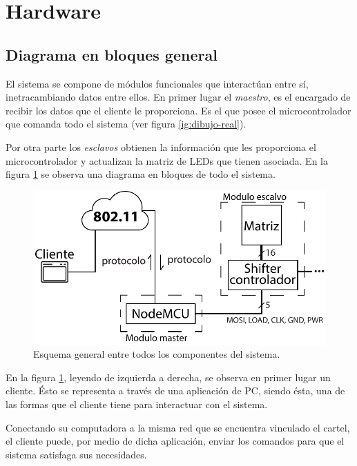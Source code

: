 \section{Hardware}\label{sec:hw}
\subsection{Diagrama en bloques general}
El sistema se compone de módulos funcionales que interactúan entre sí, inetracambiando datos entre ellos. En primer lugar el \emph{maestro}, es el encargado de recibir los datos que el cliente le proporciona. Es el que posee el microcontrolador que comanda todo el sistema (ver figura \ref{ig:dibujo-real}).

Por otra parte los \emph{esclavos} obtienen la información que les proporciona el microcontrolador y actualizan la matriz de LEDs que tienen asociada. En la figura \ref{fig:diagrama-bloques-general} se observa una diagrama en bloques de todo el sistema.

\begin{figure}[!ht]
	\centering
	\includegraphics[width=\linewidth]{imagenes/hw/diagrama-bloques-general.pdf}
	\caption{Esquema general entre todos los componentes del sistema.}
	\label{fig:diagrama-bloques-general}
\end{figure}

En la figura \ref{fig:diagrama-bloques-general}, leyendo de izquierda a derecha, se observa en primer lugar un cliente. Ésto se representa a través de una aplicación de PC, siendo ésta, una de las formas que el cliente tiene para interactuar con el sistema.

Conectando su computadora a la misma red que se encuentra vinculado el cartel, el cliente puede, por medio de dicha aplicación, enviar los comandos para que el sistema satisfaga sus necesidades.

